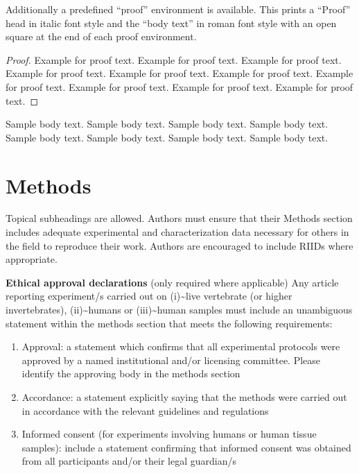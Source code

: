 \documentclass[sn-basic,pdflatex]{sn-jnl}
\theoremstyle{remark}
\theoremstyle{definition}
\begin{document}
Additionally a predefined ``proof'' environment is available. This
prints a ``Proof'' head in italic font style and the ``body text'' in
roman font style with an open square at the end of each proof
environment.

\begin{proof}
Example for proof text. Example for proof text. Example for proof text.
Example for proof text. Example for proof text. Example for proof text.
Example for proof text. Example for proof text. Example for proof text.
Example for proof text.

\end{proof}

Sample body text. Sample body text. Sample body text. Sample body text.
Sample body text. Sample body text. Sample body text. Sample body text.

\section{Methods}\label{sec11}

Topical subheadings are allowed. Authors must ensure that their Methods
section includes adequate experimental and characterization data
necessary for others in the field to reproduce their work. Authors are
encouraged to include RIIDs where appropriate.

\textbf{Ethical approval declarations} (only required where applicable)
Any article reporting experiment/s carried out on
(i)\textasciitilde live vertebrate (or higher invertebrates),
(ii)\textasciitilde humans or (iii)\textasciitilde human samples must
include an unambiguous statement within the methods section that meets
the following requirements:

\begin{enumerate}
\def\labelenumi{\arabic{enumi}.}
\item
  Approval: a statement which confirms that all experimental protocols
  were approved by a named institutional and/or licensing committee.
  Please identify the approving body in the methods section
\item
  Accordance: a statement explicitly saying that the methods were
  carried out in accordance with the relevant guidelines and regulations
\item
  Informed consent (for experiments involving humans or human tissue
  samples): include a statement confirming that informed consent was
  obtained from all participants and/or their legal guardian/s
\end{enumerate}
\end{document}
